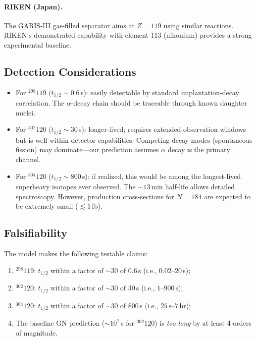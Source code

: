 \documentclass[12pt,a4paper,twocolumn]{revtex4-2}
\newcommand{\thalf}{t_{1/2}}
\begin{document}
\paragraph{RIKEN (Japan).}
The GARIS-III gas-filled separator aims at $Z = 119$
using similar reactions.  RIKEN's demonstrated
capability with element 113 (nihonium) provides a
strong experimental baseline.

\subsection{Detection Considerations}

\begin{itemize}
\item For ${}^{298}119$ ($\thalf \sim 0.6$\,s): easily
  detectable by standard implantation-decay correlation.
  The $\alpha$-decay chain should be traceable through
  known daughter nuclei.

\item For ${}^{302}120$ ($\thalf \sim 30$\,s):
  longer-lived; requires extended observation windows
  but is well within detector capabilities.  Competing
  decay modes (spontaneous fission) may dominate---our
  prediction assumes $\alpha$ decay is the primary channel.

\item For ${}^{304}120$ ($\thalf \sim 800$\,s):
  if realized, this would be among the longest-lived
  superheavy isotopes ever observed.  The $\sim 13$\,min
  half-life allows detailed spectroscopy.  However,
  production cross-sections for $N = 184$ are expected
  to be extremely small ($\lesssim 1$\,fb).
\end{itemize}

\subsection{Falsifiability}

The model makes the following testable claims:
\begin{enumerate}
\item ${}^{298}119$: $\thalf$ within a factor of $\sim 30$
  of $0.6$\,s (i.e., $0.02$--$20$\,s);
\item ${}^{302}120$: $\thalf$ within a factor of $\sim 30$
  of $30$\,s (i.e., $1$--$900$\,s);
\item ${}^{304}120$: $\thalf$ within a factor of $\sim 30$
  of $800$\,s (i.e., $25$\,s--$7$\,hr);
\item The baseline GN prediction ($\sim 10^7$\,s for
  ${}^{302}120$) is \emph{too long} by at least 4 orders
  of magnitude.
\end{enumerate}
\end{document}
